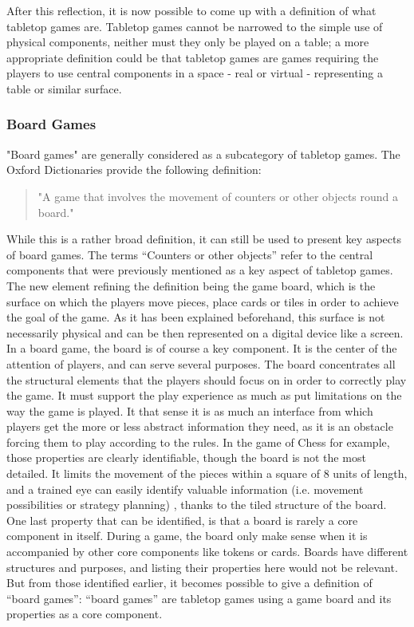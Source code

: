 After this reflection, it is now possible to come up with a definition of what tabletop games are. Tabletop games cannot be narrowed to the simple use of physical components, neither must they only be played on a table; a more appropriate definition could be that tabletop games are games requiring the players to use central components in a space - real or virtual - representing a table or similar surface.


\subsubsection{Board Games}

"Board games" are generally considered as a subcategory of tabletop games. The Oxford Dictionaries provide the following definition:
\begin{quotation}
"A game that involves the movement of counters or other objects round a board."
\end{quotation}
While this is a rather broad definition, it can still be used to present key aspects of board games. The terms “Counters or other objects” refer to the central components that were previously mentioned as a key aspect of tabletop games. The new element refining the definition being the game board, which is the surface on which the players move pieces, place cards or tiles in order to achieve the goal of the game. As it has been explained beforehand, this surface is not necessarily physical and can be then represented on a digital device like a screen. In a board game, the board is of course a key component. It is the center of the attention of players, and can serve several purposes. 
The board concentrates all the structural elements that the players should focus on in order to correctly play the game. It must support the play experience as much as put limitations on the way the game is played. It that sense it is as much an interface from which players get the more or less abstract information they need, as it is an obstacle forcing them to play according to the rules. In the game of Chess for example, those properties are clearly identifiable, though the board is not the most detailed. It limits the movement of the pieces within a square of 8 units of length, and a trained eye can easily identify valuable information (i.e. movement possibilities or strategy planning) , thanks to the tiled structure of the board. One last property that can be identified, is that a board is rarely a core component in itself. During a game, the board only make sense when it is accompanied by other core components like tokens or cards. Boards have different structures and purposes, and listing their properties here would not be relevant. But from those identified earlier, it becomes possible to give a definition of “board games”: “board games” are tabletop games using a game board and its properties as a core component.

